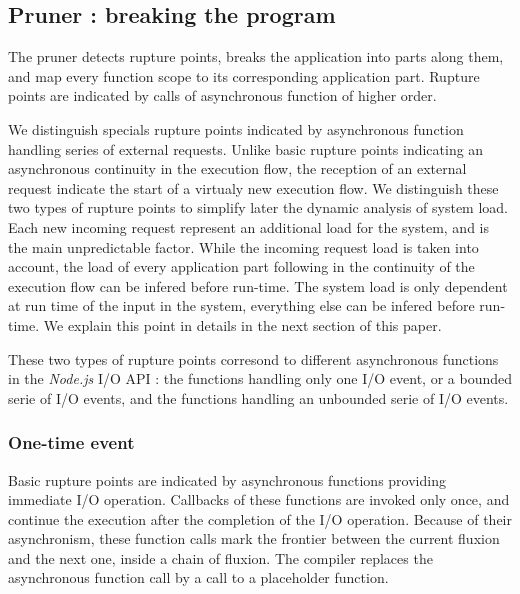 \subsection{Pruner : breaking the program}

The pruner detects rupture points, breaks the application into parts along them, and map every function scope to its corresponding application part.
Rupture points are indicated by calls of asynchronous function of higher order.

We distinguish specials rupture points indicated by asynchronous function handling series of external requests.
Unlike basic rupture points indicating an asynchronous continuity in the execution flow, the reception of an external request indicate the start of a virtualy new execution flow.
We distinguish these two types of rupture points to simplify later the dynamic analysis of system load.
Each new incoming request represent an additional load for the system, and is the main unpredictable factor.
While the incoming request load is taken into account, the load of every application part following in the continuity of the execution flow can be infered before run-time. 
The system load is only dependent at run time of the input in the system, everything else can be infered before run-time.
We explain this point in details in the next section of this paper.

These two types of rupture points corresond to different asynchronous functions in the \textit{Node.js} I/O API : the functions handling only one I/O event, or a bounded serie of I/O events, and the functions handling an unbounded serie of I/O events.

\subsubsection{One-time event} \label{sss:post}

Basic rupture points are indicated by asynchronous functions providing immediate I/O operation.
Callbacks of these functions are invoked only once, and continue the execution after the completion of the I/O operation.
Because of their asynchronism, these function calls mark the frontier between the current fluxion and the next one, inside a chain of fluxion.
The compiler replaces the asynchronous function call by a call to a placeholder function.

